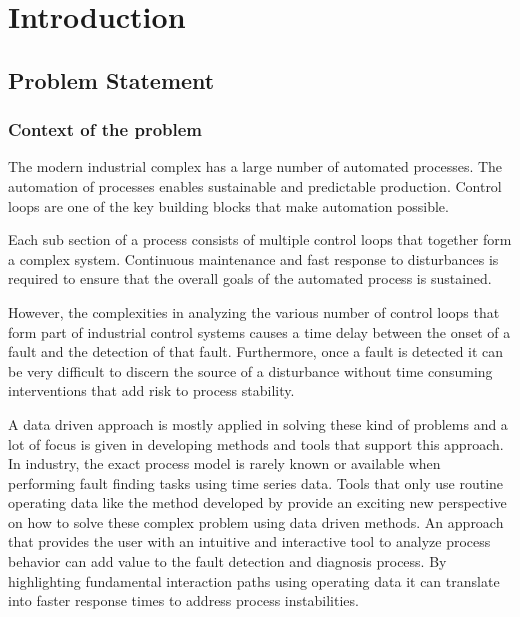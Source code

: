 
\chapter{Introduction}

\section{Problem Statement}

\subsection{Context of the problem}

The modern industrial complex has a large number of automated processes. The automation of processes enables sustainable and predictable production. Control loops are one of the key building blocks that make automation possible.\par
Each sub section of a process consists of multiple control loops that together form a complex system. Continuous maintenance and fast response to disturbances is required to ensure that the overall goals of the automated process is sustained.\par
However, the complexities in analyzing the various number of control loops that form part of industrial control systems causes a time delay between the onset of a fault and the detection of that fault. Furthermore, once a fault is detected it can be very difficult to discern the source of a disturbance without time consuming interventions that add risk to process stability.\cite{thornhill2007advances}\par
A data driven approach is mostly applied in solving these kind of problems and a lot of focus is given in developing methods and tools that support this approach. 
In industry, the exact process model is rarely known or available when performing fault finding tasks using time series data.\cite{rahman2010new} Tools that only use routine operating data like the method developed by \cite{farenzena2009looprank} provide an exciting new perspective on how to solve these complex problem using data driven methods. An approach that provides the user with an intuitive and interactive tool to analyze process behavior can add value to the fault detection and diagnosis process. By highlighting fundamental interaction paths using operating data it can translate into faster response times to address process instabilities.\par
